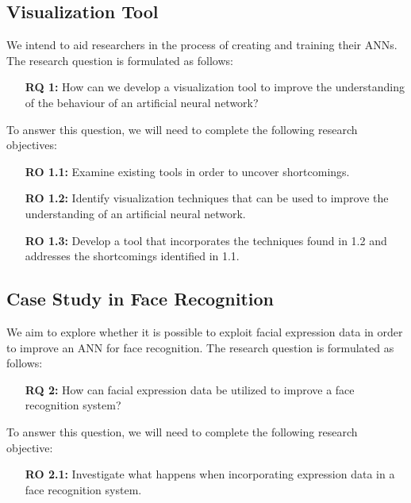 \subsection{Visualization Tool}

We intend to aid researchers in the process of creating and training their ANNs. The research question is formulated as follows:

\begin{enumerate}[align=left, labelwidth=3.5em, leftmargin=!, itemindent=0em]
    \item[\textbf{RQ 1:}]How can we develop a visualization tool to improve the understanding of the behaviour of an artificial neural network?
\end{enumerate}

\noindent To answer this question, we will need to complete the following research objectives:

\begin{enumerate}[align=left, labelwidth=3.5em, leftmargin=!, itemindent=0em]
    \item[\textbf{RO 1.1:}] Examine existing tools in order to uncover shortcomings.
    \item[\textbf{RO 1.2:}] Identify visualization techniques that can be used to improve the understanding of an artificial neural network.
    \item[\textbf{RO 1.3:}]Develop a tool that incorporates the techniques found in 1.2 and addresses the shortcomings identified in 1.1.
\end{enumerate}

\subsection{Case Study in Face Recognition}

We aim to explore whether it is possible to exploit facial expression data in order to improve an ANN for face recognition. The research question is formulated as follows:

\begin{enumerate}[align=left, labelwidth=3.5em, leftmargin=!, itemindent=0em]
    \item[\textbf{RQ 2:}]How can facial expression data be utilized to improve a face recognition system?
\end{enumerate}

\noindent To answer this question, we will need to complete the following research objective:

\begin{enumerate}[align=left, labelwidth=3.5em, leftmargin=!, itemindent=0em]
    \item[\textbf{RO 2.1:}]Investigate what happens when incorporating expression data in a face recognition system.
\end{enumerate}

